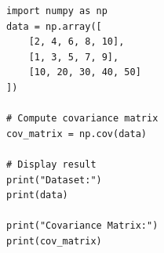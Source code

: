 \begin{verbatim}
import numpy as np
data = np.array([
    [2, 4, 6, 8, 10],
    [1, 3, 5, 7, 9],
    [10, 20, 30, 40, 50]
])

# Compute covariance matrix
cov_matrix = np.cov(data)

# Display result
print("Dataset:")
print(data)

print("Covariance Matrix:")
print(cov_matrix)
\end{verbatim}
